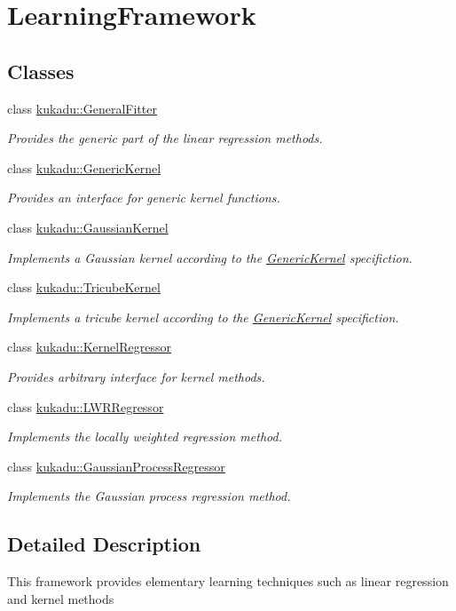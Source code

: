 \hypertarget{group__LearningFramework}{}\section{Learning\+Framework}
\label{group__LearningFramework}
\subsection*{Classes}
\begin{DoxyCompactItemize}
\item 
class \hyperlink{classkukadu_1_1GeneralFitter}{kukadu\+::\+General\+Fitter}
\begin{DoxyCompactList}\small\item\em Provides the generic part of the linear regression methods. \end{DoxyCompactList}\item 
class \hyperlink{classkukadu_1_1GenericKernel}{kukadu\+::\+Generic\+Kernel}
\begin{DoxyCompactList}\small\item\em Provides an interface for generic kernel functions. \end{DoxyCompactList}\item 
class \hyperlink{classkukadu_1_1GaussianKernel}{kukadu\+::\+Gaussian\+Kernel}
\begin{DoxyCompactList}\small\item\em Implements a Gaussian kernel according to the \hyperlink{classkukadu_1_1GenericKernel}{Generic\+Kernel} specifiction. \end{DoxyCompactList}\item 
class \hyperlink{classkukadu_1_1TricubeKernel}{kukadu\+::\+Tricube\+Kernel}
\begin{DoxyCompactList}\small\item\em Implements a tricube kernel according to the \hyperlink{classkukadu_1_1GenericKernel}{Generic\+Kernel} specifiction. \end{DoxyCompactList}\item 
class \hyperlink{classkukadu_1_1KernelRegressor}{kukadu\+::\+Kernel\+Regressor}
\begin{DoxyCompactList}\small\item\em Provides arbitrary interface for kernel methods. \end{DoxyCompactList}\item 
class \hyperlink{classkukadu_1_1LWRRegressor}{kukadu\+::\+L\+W\+R\+Regressor}
\begin{DoxyCompactList}\small\item\em Implements the locally weighted regression method. \end{DoxyCompactList}\item 
class \hyperlink{classkukadu_1_1GaussianProcessRegressor}{kukadu\+::\+Gaussian\+Process\+Regressor}
\begin{DoxyCompactList}\small\item\em Implements the Gaussian process regression method. \end{DoxyCompactList}\end{DoxyCompactItemize}


\subsection{Detailed Description}
This framework provides elementary learning techniques such as linear regression and kernel methods 